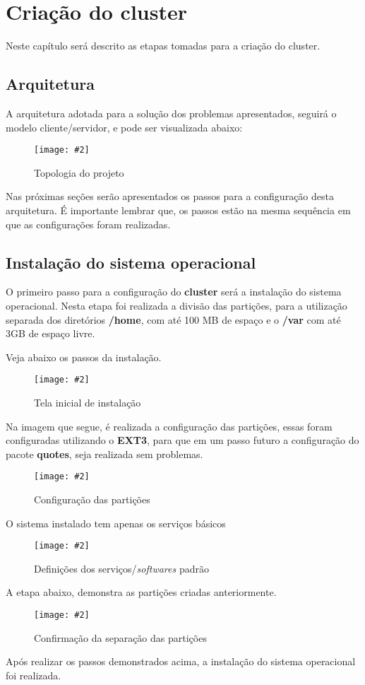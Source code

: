 \documentclass[
	12pt,				%
	openany,			%
	a4paper,			%
	chapter=TITLE,		%
	section=TITLE,		%
	english,
	brazil				%
]{abntex2}
\newcommand{\includeImage}[3] {

\begin{figure}[H]
 	 \centering
  		\texttt{[image: \#2]}
  	\caption{#3}
\end{figure}

}
\begin{document}
\chapter{Criação do cluster}

Neste capítulo será descrito as etapas tomadas para a criação do cluster. 

\section{Arquitetura}

A arquitetura adotada para a solução dos problemas apresentados, seguirá o modelo cliente/servidor, e pode ser visualizada abaixo:

\includeImage{0.7}{imgs/others/topologia.png}{Topologia do projeto}

Nas próximas seções serão apresentados os passos para a configuração desta arquitetura. É importante lembrar que, os passos estão na mesma sequência em que as configurações foram realizadas.

\section{Instalação do sistema operacional}

O primeiro passo para a configuração do \textbf{cluster} será a instalação do sistema operacional. Nesta etapa foi realizada a divisão das partições, para a utilização separada dos diretórios \textbf{/home}, com até 100 MB de espaço e o \textbf{/var} com até 3GB de espaço livre.

Veja abaixo os passos da instalação.

\includeImage{0.5}{imgs/1_instalacao/1.png}{Tela inicial de instalação}

Na imagem que segue, é realizada a configuração das partições, essas foram configuradas utilizando o \textbf{EXT3}, para que em um passo futuro a configuração do pacote \textbf{quotes}, seja realizada sem problemas.
\includeImage{0.5}{imgs/1_instalacao/2.png}{Configuração das partições}

O sistema instalado tem apenas os serviços básicos
\includeImage{0.5}{imgs/1_instalacao/3.png}{Definições dos serviços/\textit{softwares} padrão}

A etapa abaixo, demonstra as partições criadas anteriormente.
\includeImage{0.5}{imgs/1_instalacao/4.png}{Confirmação da separação das partições}

Após realizar os passos demonstrados acima, a instalação do sistema operacional foi realizada.
\end{document}
